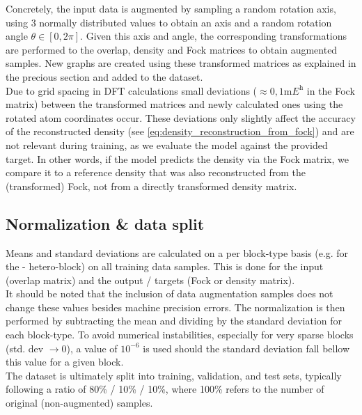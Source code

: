 Concretely, the input data is augmented by sampling a random rotation axis, using 3 normally distributed values to obtain an axis and a random rotation angle $\theta \in [0, 2\pi]$. Given this axis and angle, the corresponding transformations are performed to the overlap, density and Fock matrices to obtain augmented samples. New graphs are created using these transformed matrices as explained in the precious section and added to the dataset. \\
Due to grid spacing in DFT calculations small deviations ($\approx 0,1 \unit{\milli\hartree}$ in the Fock matrix) between the transformed matrices and newly calculated ones using the rotated atom coordinates occur. These deviations only slightly affect the accuracy of the reconstructed density (see \autoref{eq:density_reconstruction_from_fock}) and are not relevant during training, as we evaluate the model against the provided target. In other words, if the model predicts the density via the Fock matrix, we compare it to a reference density that was also reconstructed from the (transformed) Fock, not from a directly transformed density matrix.\\

\subsection{Normalization \& data split}
\label{subsec:gnn_normalization}
Means and standard deviations are calculated on a per block-type basis (e.g. for the - hetero-block) on all training data samples. This is done for the input (overlap matrix) and the output / targets (Fock or density matrix).\\
It should be noted that the inclusion of data augmentation samples does not change these values besides machine precision errors. The normalization is then performed by subtracting the mean and dividing by the standard deviation for each block-type. To avoid numerical instabilities, especially for very sparse blocks (std. dev $\rightarrow 0$), a value of $10^{-6}$ is used should the standard deviation fall bellow this value for a given block. \\

The dataset is ultimately split into training, validation, and test sets, typically following a ratio of 80\% / 10\% / 10\%, where 100\% refers to the number of original (non-augmented) samples.

